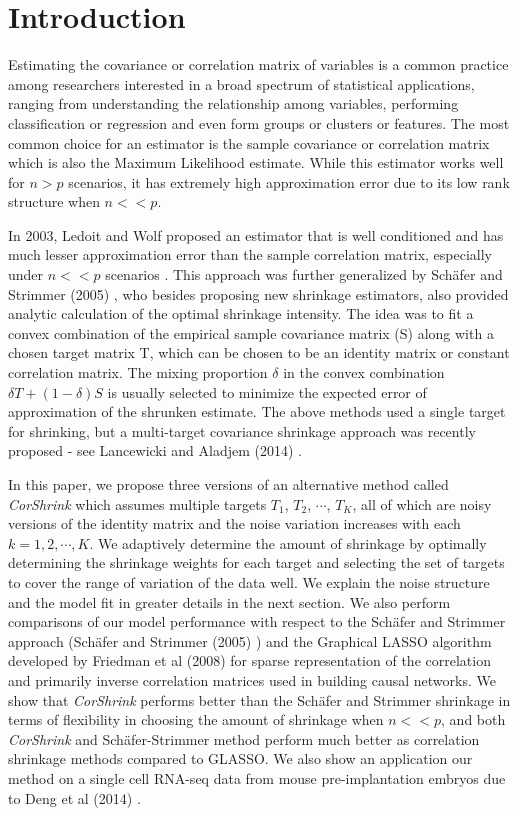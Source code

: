 
\section{Introduction}
Estimating the covariance or correlation matrix of variables is a common practice among researchers interested in a broad spectrum of statistical applications, ranging from understanding the relationship among variables, performing classification or regression and even form groups or clusters or features. The most common choice for an estimator is the sample covariance or correlation matrix which is also the Maximum Likelihood estimate. While this estimator works well for $ n > p$ scenarios, it has extremely high approximation error due to its low rank structure when $ n << p$. 

In 2003, Ledoit and Wolf proposed an estimator that is well conditioned and has much lesser approximation error than the sample correlation matrix, especially under $n <<p$ scenarios \cite{Ledoit2003} \cite{Ledoit2004}. This approach was further generalized by Sch\"{a}fer and Strimmer (2005) \cite{Schafer2005} \cite{Schafer2005b}, who besides proposing new shrinkage estimators, also provided  analytic calculation of the optimal shrinkage intensity. The idea was to fit a convex combination of the empirical sample covariance matrix (S) along with a chosen target matrix T, which can be chosen to be an  identity matrix or constant correlation matrix. The mixing proportion $\delta$ in the convex combination $\delta T + (1- \delta) S$ is usually selected to minimize the expected error of approximation of the shrunken estimate. The above methods used a single target for shrinking, but a multi-target covariance shrinkage approach was recently proposed - see Lancewicki and Aladjem  (2014) \cite{Lancewiki2014}. 

In this paper, we propose three versions of an alternative method called \textit{CorShrink} which assumes multiple targets 
$T_1$, $T_2$, $\cdots$, $T_K$, all of which are noisy versions of the identity matrix and the noise variation increases with each $k=1,2,\cdots, K$. We adaptively determine the amount of shrinkage by optimally determining the shrinkage weights for each target and selecting the set of targets to cover the range of variation of the data well. We explain the noise structure and the model fit in greater details in the next section.  We also perform comparisons of our model performance with respect to the Sch\"{a}fer and Strimmer approach (Sch\"{a}fer and Strimmer (2005) \cite{Schafer2005}) and the Graphical LASSO algorithm developed by Friedman et al (2008) \cite{Friedman2008} for sparse representation of the correlation and primarily inverse correlation matrices used in building causal networks. We show that  \textit{CorShrink} performs better than the Sch\"{a}fer and Strimmer shrinkage in terms of flexibility in choosing the amount of shrinkage when $ n << p$, and both \textit{CorShrink} and Sch\"{a}fer-Strimmer method perform much better as correlation shrinkage methods compared to GLASSO. We also show an application our method on a single cell RNA-seq data from mouse pre-implantation embryos due to Deng et al (2014) \cite{Deng2014}.


